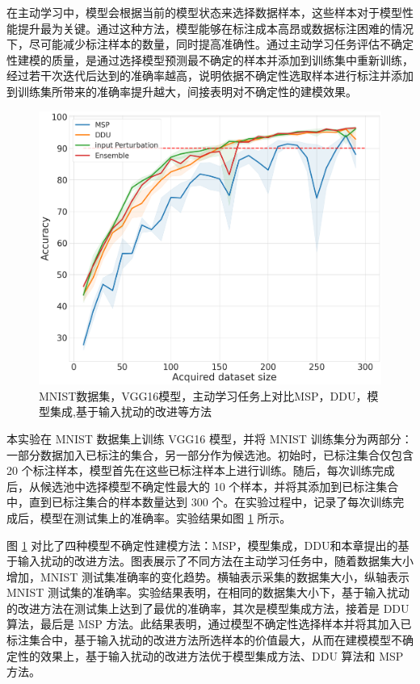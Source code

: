 在主动学习中，模型会根据当前的模型状态来选择数据样本，这些样本对于模型性能提升最为关键。通过这种方法，模型能够在标注成本高昂或数据标注困难的情况下，尽可能减少标注样本的数量，同时提高准确性。通过主动学习任务评估不确定性建模的质量，是通过选择模型预测最不确定的样本并添加到训练集中重新训练，经过若干次迭代后达到的准确率越高，说明依据不确定性选取样本进行标注并添加到训练集所带来的准确率提升越大，间接表明对不确定性的建模效果。

\begin{figure}[h]
    \captionsetup{font=small, justification=centering}
    \centering
    \includegraphics[width=0.75\linewidth]{assets/mnist_test_accuracy_active_learning.png}
    \caption{MNIST数据集，VGG16模型，主动学习任务上对比MSP，DDU，模型集成,基于输入扰动的改进等方法}
    \label{fig:active learning}
\end{figure}
本实验在 MNIST 数据集上训练 VGG16 模型，并将 MNIST 训练集分为两部分：一部分数据加入已标注的集合，另一部分作为候选池。初始时，已标注集合仅包含 20 个标注样本，模型首先在这些已标注样本上进行训练。随后，每次训练完成后，从候选池中选择模型不确定性最大的 10 个样本，并将其添加到已标注集合中，直到已标注集合的样本数量达到 300 个。在实验过程中，记录了每次训练完成后，模型在测试集上的准确率。实验结果如图 \ref{fig:active learning} 所示。

图 \ref{fig:active learning} 对比了四种模型不确定性建模方法：MSP，模型集成，DDU和本章提出的基于输入扰动的改进方法。图表展示了不同方法在主动学习任务中，随着数据集大小增加，MNIST 测试集准确率的变化趋势。横轴表示采集的数据集大小，纵轴表示 MNIST 测试集的准确率。实验结果表明，在相同的数据集大小下，基于输入扰动的改进方法在测试集上达到了最优的准确率，其次是模型集成方法，接着是 DDU 算法，最后是 MSP 方法。此结果表明，通过模型不确定性选择样本并将其加入已标注集合中，基于输入扰动的改进方法所选样本的价值最大，从而在建模模型不确定性的效果上，基于输入扰动的改进方法优于模型集成方法、DDU 算法和 MSP 方法。


